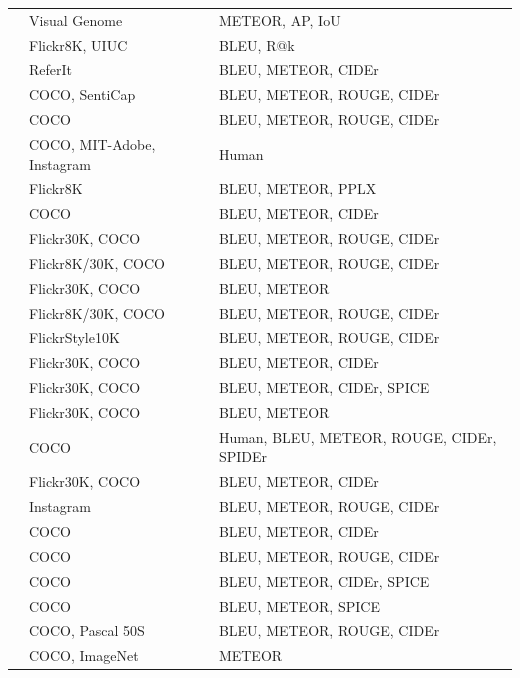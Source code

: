 \begin{longtable}{ p{} p{} p{} }
    \citet{Johnson2016} & Visual Genome & METEOR, AP, IoU \\
    \citet{Ma2016} & Flickr8K, UIUC & BLEU, R@k \\
    \citet{Mao2016} & ReferIt & BLEU, METEOR, CIDEr \\
    \citet{Mathews2016} & COCO, SentiCap & BLEU, METEOR, ROUGE, CIDEr \\
    \citet{Sugano2016} & COCO & BLEU, METEOR, ROUGE, CIDEr \\
    \citet{Tran2016} & COCO, MIT-Adobe, Instagram &  Human\\
    \citet{Wang2016_Parallel} & Flickr8K & BLEU, METEOR, PPLX \\
    \citet{Yang2016_RevNet} & COCO & BLEU, METEOR, CIDEr \\
    \citet{You2016} & Flickr30K, COCO & BLEU, METEOR, ROUGE, CIDEr \\
    \citet{Chen2017_SCA} & Flickr8K/30K, COCO & BLEU, METEOR, ROUGE, CIDEr \\
    \citet{Dai2017_CGAN} & Flickr30K, COCO & BLEU, METEOR \\
    \citet{Fu2017} & Flickr8K/30K, COCO & BLEU, METEOR, ROUGE, CIDEr \\
    \citet{Gan2017_Style} & FlickrStyle10K & BLEU, METEOR, ROUGE, CIDEr \\
    \citet{Gan2017_SCN} & Flickr30K, COCO &  BLEU, METEOR, CIDEr \\
    \citet{Gu2017} & Flickr30K, COCO & BLEU, METEOR, CIDEr, SPICE \\
    \citet{Liu2017_SAM} & Flickr30K, COCO & BLEU, METEOR \\
    \citet{Liu2017_PG} & COCO & Human, BLEU, METEOR, ROUGE, CIDEr, SPIDEr \\
    \citet{Lu2017} & Flickr30K, COCO & BLEU, METEOR, CIDEr \\
    \citet{Park2017} & Instagram & BLEU, METEOR, ROUGE, CIDEr \\
    \citet{Pedersoli2017} & COCO & BLEU, METEOR, CIDEr \\
    \citet{Ren2017} & COCO & BLEU, METEOR, ROUGE, CIDEr \\
    \citet{Rennie2017} & COCO & BLEU, METEOR, CIDEr, SPICE \\
    \citet{Shetty2017} & COCO & BLEU, METEOR, SPICE \\
    \citet{Tavakoliy2017} & COCO, Pascal 50S & BLEU, METEOR, ROUGE, CIDEr \\
    \citet{Venugopalan2017} & COCO, ImageNet & METEOR \\

\end{longtable}
